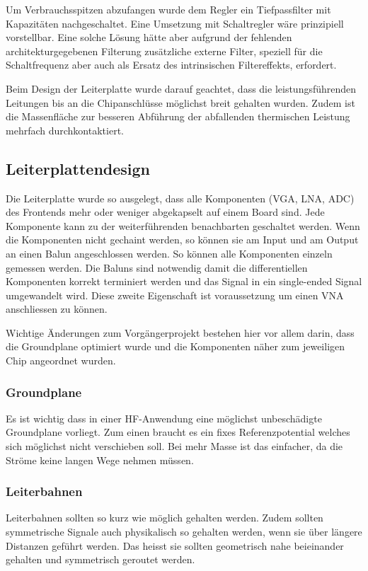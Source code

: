 Um Verbrauchsspitzen abzufangen wurde dem Regler ein Tiefpassfilter mit Kapazitäten nachgeschaltet.
Eine Umsetzung mit Schaltregler wäre prinzipiell vorstellbar. Eine solche Lösung hätte aber aufgrund der fehlenden architekturgegebenen Filterung zusätzliche externe Filter, speziell für die Schaltfrequenz aber auch als Ersatz des intrinsischen Filtereffekts, erfordert.

Beim Design der Leiterplatte wurde darauf geachtet, dass die leistungsführenden Leitungen bis an die Chipanschlüsse möglichst breit gehalten wurden. Zudem ist die Massenfläche zur besseren Abführung der abfallenden thermischen Leistung mehrfach durchkontaktiert.

\subsection{Leiterplattendesign}
\label{subsec:Leiterplattendesign}
Die Leiterplatte wurde so ausgelegt, dass alle Komponenten (VGA, LNA, ADC) des Frontends mehr oder weniger abgekapselt auf einem Board sind. Jede Komponente kann zu der weiterführenden benachbarten geschaltet werden. Wenn die Komponenten nicht gechaint werden, so können sie am Input und am Output an einen Balun angeschlossen werden. So können alle Komponenten einzeln gemessen werden. Die Baluns sind notwendig damit die differentiellen Komponenten korrekt terminiert werden und das Signal in ein single-ended Signal umgewandelt wird. Diese zweite Eigenschaft ist voraussetzung um einen VNA anschliessen zu können.

Wichtige Änderungen zum Vorgängerprojekt bestehen hier vor allem darin, dass die Groundplane optimiert wurde und die Komponenten näher zum jeweiligen Chip angeordnet wurden.

\subsubsection*{Groundplane}
Es ist wichtig dass in einer HF-Anwendung eine möglichst unbeschädigte Groundplane vorliegt. Zum einen braucht es ein fixes Referenzpotential welches sich möglichst nicht verschieben soll. Bei mehr Masse ist das einfacher, da die Ströme keine langen Wege nehmen müssen.

\subsubsection*{Leiterbahnen}
Leiterbahnen sollten so kurz wie möglich gehalten werden. Zudem sollten symmetrische Signale auch physikalisch so gehalten werden, wenn sie über längere Distanzen geführt werden. Das heisst sie sollten geometrisch nahe beieinander gehalten und symmetrisch geroutet werden. 

